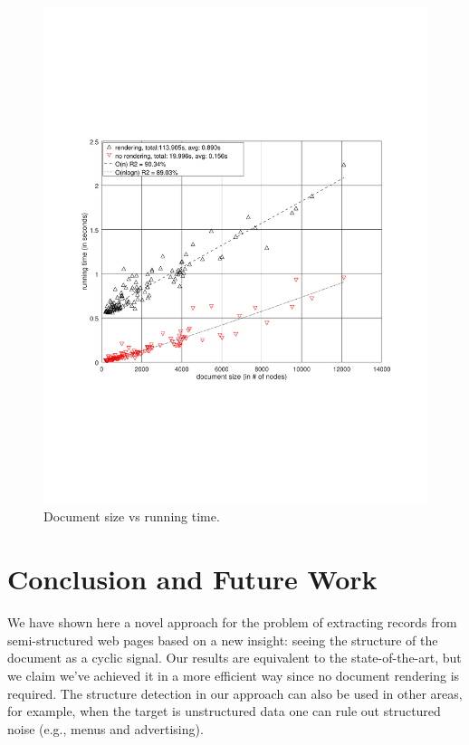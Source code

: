 \documentclass{vldb}
\begin{document}
\begin{figure}[h]
  \centering
     \includegraphics[trim={2.5cm 7.5cm 1cm 6.5cm}, width=\linewidth
     ]{img/runtime.pdf}
  \caption{Document size vs running time.}
  \label{fig:runtime}
\end{figure}

\section{Conclusion and Future Work}\label{sec:con}

We have shown here a novel approach for the problem of extracting records from
semi-structured web pages based on a new insight: seeing the structure of the
document as a cyclic signal. Our results are equivalent to the state-of-the-art,
but we claim we've achieved it in a more efficient way since no document
rendering is required. The structure detection in our approach can also be used
in other areas, for example, when the target is unstructured data one can rule
out structured noise (e.g., menus and advertising).
\end{document}
